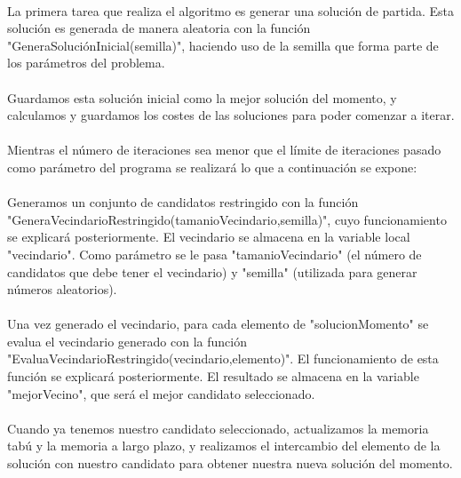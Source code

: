 \documentclass{article}
\begin{document}
	\paragraph{} La primera tarea que realiza el algoritmo es generar una solución de partida. Esta solución es generada de manera aleatoria con la función "GeneraSoluciónInicial(semilla)", haciendo uso de la semilla que forma parte de los parámetros del problema.
	
	\paragraph{}Guardamos esta solución inicial como la mejor solución del momento, y calculamos y guardamos los costes de las soluciones para poder comenzar a iterar.
	
	\paragraph{}Mientras el número de iteraciones sea menor que el límite de iteraciones pasado como parámetro del programa se realizará lo que a continuación se expone:
	
	\paragraph{}Generamos un conjunto de candidatos restringido con la función "GeneraVecindarioRestringido(tamanioVecindario,semilla)", cuyo funcionamiento se explicará posteriormente. El vecindario se almacena en la variable local "vecindario". Como parámetro se le pasa "tamanioVecindario" (el número de candidatos que debe tener el vecindario) y "semilla" (utilizada para generar números aleatorios).
	
	\paragraph{}Una vez generado el vecindario, para cada elemento de "solucionMomento" se evalua el vecindario generado con la función "EvaluaVecindarioRestringido(vecindario,elemento)". El funcionamiento de esta función se explicará posteriormente. El resultado se almacena en la variable "mejorVecino", que será el mejor candidato seleccionado.
	
	\paragraph{}Cuando ya tenemos nuestro candidato seleccionado, actualizamos la memoria tabú y la memoria a largo plazo, y realizamos el intercambio del elemento de la solución con nuestro candidato para obtener nuestra nueva solución del momento.
	
\end{document}
